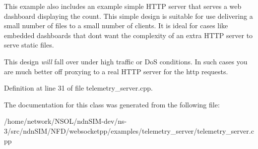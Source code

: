 This example also includes an example simple H\+T\+TP server that serves a web dashboard displaying the count. This simple design is suitable for use delivering a small number of files to a small number of clients. It is ideal for cases like embedded dashboards that don\textquotesingle{}t want the complexity of an extra H\+T\+TP server to serve static files.

This design {\itshape will} fall over under high traffic or DoS conditions. In such cases you are much better off proxying to a real H\+T\+TP server for the http requests. 

Definition at line 31 of file telemetry\+\_\+server.\+cpp.



The documentation for this class was generated from the following file\+:\begin{DoxyCompactItemize}
\item 
/home/network/\+N\+S\+O\+L/ndn\+S\+I\+M-\/dev/ns-\/3/src/ndn\+S\+I\+M/\+N\+F\+D/websocketpp/examples/telemetry\+\_\+server/telemetry\+\_\+server.\+cpp\end{DoxyCompactItemize}
